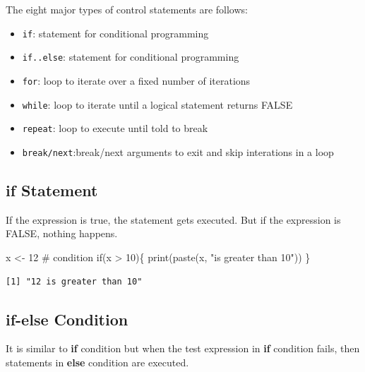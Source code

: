 \documentclass[
  letterpaper,
  DIV=11,
  numbers=noendperiod]{scrreprt}
\newenvironment{Shaded}{\begin{snugshade}}{\end{snugshade}}
\newcommand{\CommentTok}[1]{\textcolor[rgb]{0.37,0.37,0.37}{#1}}
\newcommand{\ControlFlowTok}[1]{\textcolor[rgb]{0.00,0.23,0.31}{#1}}
\newcommand{\DecValTok}[1]{\textcolor[rgb]{0.68,0.00,0.00}{#1}}
\newcommand{\FunctionTok}[1]{\textcolor[rgb]{0.28,0.35,0.67}{#1}}
\newcommand{\NormalTok}[1]{\textcolor[rgb]{0.00,0.23,0.31}{#1}}
\newcommand{\OtherTok}[1]{\textcolor[rgb]{0.00,0.23,0.31}{#1}}
\newcommand{\SpecialCharTok}[1]{\textcolor[rgb]{0.37,0.37,0.37}{#1}}
\newcommand{\StringTok}[1]{\textcolor[rgb]{0.13,0.47,0.30}{#1}}
\providecommand{\tightlist}{%
  \setlength{\itemsep}{0pt}\setlength{\parskip}{0pt}}\usepackage{longtable,booktabs,array}
\begin{document}
The eight major types of control statements are follows:

\begin{itemize}
\tightlist
\item
  \texttt{if}: statement for conditional programming
\item
  \texttt{if..else}: statement for conditional programming
\item
  \texttt{for}: loop to iterate over a fixed number of iterations
\item
  \texttt{while}: loop to iterate until a logical statement returns
  FALSE
\item
  \texttt{repeat}: loop to execute until told to break
\item
  \texttt{break/next}:break/next arguments to exit and skip interations
  in a loop
\end{itemize}

\hypertarget{if-statement}{%
\subsection{if Statement}\label{if-statement}}

If the expression is true, the statement gets executed. But if the
expression is FALSE, nothing happens.

\begin{Shaded}
\begin{Highlighting}[]
\NormalTok{x }\OtherTok{\textless{}{-}} \DecValTok{12}
\CommentTok{\# condition}
\ControlFlowTok{if}\NormalTok{(x }\SpecialCharTok{\textgreater{}} \DecValTok{10}\NormalTok{)\{}
\FunctionTok{print}\NormalTok{(}\FunctionTok{paste}\NormalTok{(x, }\StringTok{"is greater than 10"}\NormalTok{))}
\NormalTok{\}}
\end{Highlighting}
\end{Shaded}

\begin{verbatim}
[1] "12 is greater than 10"
\end{verbatim}

\hypertarget{if-else-condition}{%
\subsection{if-else Condition}\label{if-else-condition}}

It is similar to \textbf{if} condition but when the test expression in
\textbf{if} condition fails, then statements in \textbf{else} condition
are executed.
\end{document}
